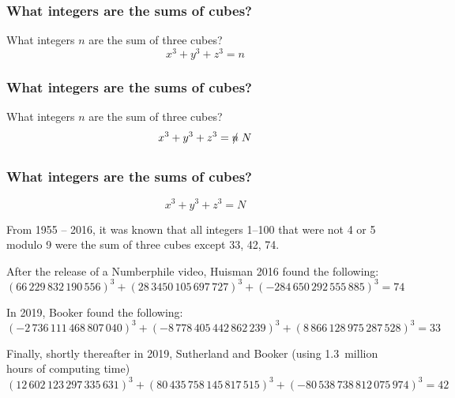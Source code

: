 \begin{frame}[plain,t] \frametitle{What integers are the sums of cubes?} \footnotesize
What integers $n$ are the sum of three cubes?
	\[
	x^3 + y^3 + z^3= n
	\]
\end{frame}



\begin{frame}[plain,t] \frametitle{What integers are the sums of cubes?} \footnotesize
What integers $n$ are the sum of three cubes?
	\[
	x^3 + y^3 + z^3= \xout{n} \; N
	\]
\end{frame}



\begin{frame} \frametitle{What integers are the sums of cubes?} \footnotesize
	\[
	x^3 + y^3 + z^3= N
	\] \pspace

{\color{SwarthGarnet} \textbullet} From 1955 -- 2016, it was known that all integers 1--100 that were not 4 or 5 modulo 9 were the sum of three cubes except 33, 42, 74. \pspace

{\color{SwarthGarnet} \textbullet} After the release of a Numberphile video, Huisman 2016 found the following:
	{\footnotesize
	\[
	(66\,229\,832\,190\,556)^3 + (28\,3450\,105\,697\,727)^3 + (-284\,650\,292\,555\,885)^3= 74
	\]
	} \pspace
	
{\color{SwarthGarnet} \textbullet} In 2019, Booker found the following:
	{\footnotesize
	\[
	(-2\,736\,111\,468\,807\,040)^3 + (-8\,778\,405\,442\,862\,239)^3 + (8\,866\,128\,975\,287\,528)^3= 33
	\]
	} \pspace
	
{\color{SwarthGarnet} \textbullet} Finally, shortly thereafter in 2019, Sutherland and Booker (using 1.3~million hours of computing time)
	{\footnotesize
	\[
	(12\,602\,123\,297\,335\,631)^3 + (80\,435\,758\,145\,817\,515)^3 + (-80\,538\,738\,812\,075\,974)^3= 42
	\]
	}
\end{frame}



